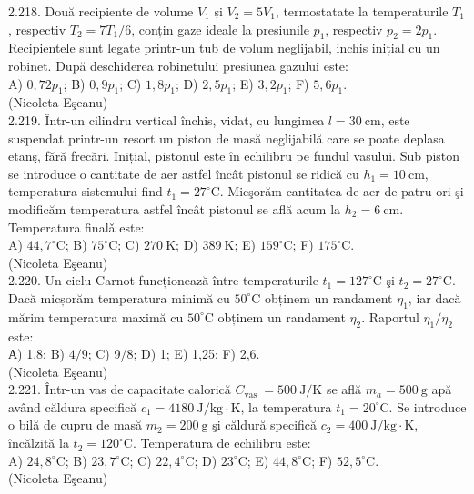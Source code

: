 2.218. Două recipiente de volume $V_{1}$ și $V_{2}=5 V_{1}$, termostatate la temperaturile $T_{1}$, respectiv $T_{2}=7 T_{1} / 6$, conțin gaze ideale la presiunile $p_{1}$, respectiv $p_{2}=2 p_{1}$. Recipientele sunt legate printr-un tub de volum neglijabil, inchis inițial cu un robinet. După deschiderea robinetului presiunea gazului este:\\ A) $0,72 p_{1}$; B) $0,9 p_{1}$; C) $1,8 p_{1}$; D) $2,5 p_{1}$; E) $3,2 p_{1}$; F) $5,6 p_{1}$.\\ (Nicoleta Eşeanu)\\

2.219. Într-un cilindru vertical închis, vidat, cu lungimea $l=30 \mathrm{~cm}$, este suspendat printr-un resort un piston de masă neglijabilă care se poate deplasa etanş, fără frecări. Inițial, pistonul este în echilibru pe fundul vasului. Sub piston se introduce o cantitate de aer astfel încât pistonul se ridică cu $h_{1}=10 \mathrm{~cm}$, temperatura sistemului find $t_{1}=27^{\circ} \mathrm{C}$. Micşorăm cantitatea de aer de patru ori şi modificăm temperatura astfel încât pistonul se află acum la $h_{2}=6 \mathrm{~cm}$. Temperatura finalǎ este:\\ A) $44,7^{\circ} \mathrm{C}$; B) $75^{\circ} \mathrm{C}$; C) $270 \mathrm{~K}$; D) $389 \mathrm{~K}$; E) $159^{\circ} \mathrm{C}$; F) $175^{\circ} \mathrm{C}$.\\ (Nicoleta Eşeanu)\\

2.220. Un ciclu Carnot funcționează între temperaturile $t_{1}=127^{\circ} \mathrm{C}$ şi $t_{2}=27^{\circ} \mathrm{C}$. Dacă micșorăm temperatura minimă cu $50^{\circ} \mathrm{C}$ obținem un randament $\eta_{1}$, iar dacă mărim temperatura maximă cu $50^{\circ} \mathrm{C}$ obținem un randament $\eta_{2}$. Raportul $\eta_{1} / \eta_{2}$ este:\\ А) 1,8; B) $4 / 9$; C) 9/8; D) 1; E) 1,25; F) 2,6.\\ (Nicoleta Eşeanu)\\

2.221. Într-un vas de capacitate calorică $C_{\text {vas }}=500 \mathrm{~J} / \mathrm{K}$ se află $m_{a}=500 \mathrm{~g}$ apă având căldura specifică $c_{1}=4180 \mathrm{~J} / \mathrm{kg} \cdot \mathrm{K}$, la temperatura $t_{1}=20^{\circ} \mathrm{C}$. Se introduce o bilă de cupru de masă $m_{2}=200 \mathrm{~g}$ şi căldură specifică $c_{2}=400 \mathrm{~J} / \mathrm{kg} \cdot \mathrm{K}$, încălzită la $t_{2}=120^{\circ} \mathrm{C}$. Temperatura de echilibru este:\\ A) $24,8^{\circ} \mathrm{C}$; B) $23,7^{\circ} \mathrm{C}$; C) $22,4^{\circ} \mathrm{C}$; D) $23^{\circ} \mathrm{C}$; E) $44,8^{\circ} \mathrm{C}$; F) $52,5^{\circ} \mathrm{C}$.\\ (Nicoleta Eşeanu)\\

